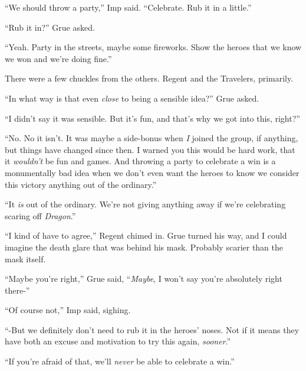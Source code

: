 





``We should throw a party,'' Imp said.  ``Celebrate.  Rub it in a little.''



``Rub it in?'' Grue asked.



``Yeah.  Party in the streets, maybe some fireworks.  Show the heroes that we know we won and we're doing fine.''



There were a few chuckles from the others.  Regent and the Travelers, primarily.



``In what way is that even \emph{close} to being a sensible idea?''  Grue asked.



``I didn't say it was sensible.  But it's fun, and that's why we got into this, right?''



``No.  No it isn't.  It was maybe a side-bonus when \emph{I} joined the group, if anything, but things have changed since then.  I warned you this would be hard work, that it \emph{wouldn't} be fun and games.  And throwing a party to celebrate a win is a monumentally bad idea when we don't even want the heroes to know we consider this victory anything out of the ordinary.''



``It \emph{is} out of the ordinary.  We're not giving anything away if we're celebrating scaring off \emph{Dragon}.''



``I kind of have to agree,'' Regent chimed in.  Grue turned his way, and I could imagine the death glare that was behind his mask.  Probably scarier than the mask itself.



``Maybe you're right,'' Grue said, ``\emph{Maybe}, I won't say you're absolutely right there-''



``Of course not,'' Imp said, sighing.



``-But we definitely don't need to rub it in the heroes' noses.  Not if it means they have both an excuse and motivation to try this again, \emph{sooner}.''



``If you're afraid of that, we'll \emph{never} be able to celebrate a win.''



